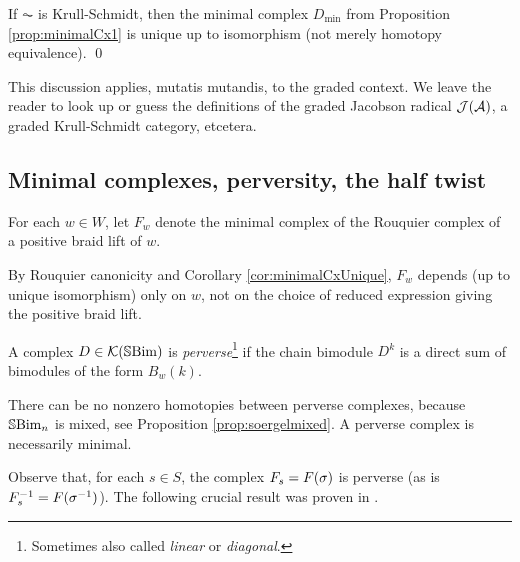 \begin{corollary}\label{cor:minimalCxUnique}
If $\AC$ is Krull-Schmidt, then the minimal complex $D_{\min}$ from Proposition \ref{prop:minimalCx1} is unique up to isomorphism (not merely homotopy equivalence). \qed
\end{corollary}

This discussion applies, mutatis mutandis, to the graded context. We leave the reader to look up or guess the definitions of the graded Jacobson radical ${\mathcal{J}}({\mathcal{A}})$, a graded Krull-Schmidt category, etcetera.

\subsection{Minimal complexes, perversity, the half twist}
\label{subsec:minimalRouq}

\begin{definition}\label{def:rouquierMinCx}
For each $w\in W$, let $F_w$ denote the minimal complex of the Rouquier complex of a positive braid lift of $w$.
\end{definition}

By Rouquier canonicity and Corollary \ref{cor:minimalCxUnique}, $F_w$ depends (up to unique isomorphism) only on $w$, not on the choice of reduced expression giving the positive braid lift.

	

\begin{defn}\label{def:perverse}  A complex $D \in {\mathcal{K}}({\mathbb{S}}{\rm Bim })$ is \emph{perverse}\footnote{Sometimes also called \emph{linear} or \emph{diagonal}.} if the chain bimodule $D^k$ is a direct sum of bimodules of the form $B_w(k)$.  \end{defn}
There can be no nonzero homotopies between perverse complexes, because ${\mathbb{S}}{\rm Bim }_n$ is mixed, see Proposition \ref{prop:soergelmixed}.  A perverse complex is necessarily minimal.  

Observe that, for each $s \in S$, the complex $F_s = F(\sigma)$ is perverse (as is $F_s^{-1} = F(\sigma^{-1})$). The following crucial result was proven in \cite[Theorem 6.9]{EWHodge}.

